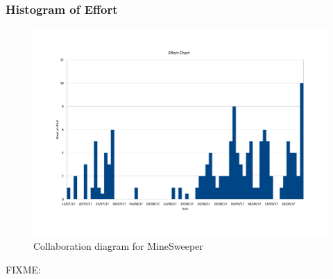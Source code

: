 \documentclass[12pt, a4]{report}
\begin{document}
\newpage
\clearpage
\subsubsection{Histogram of Effort}
\begin{figure}[!h]
	\centering
	\includegraphics[scale=0.60]{Histogram}
	\caption{Collaboration diagram for MineSweeper}
\end{figure}

\par FIXME:
	
	
\end{document}
